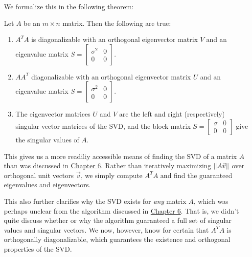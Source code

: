 \documentclass{ximera}
\begin{document}
We formalize this in the following theorem:
 
\begin{theorem}\label{th:singvaldecomp}
Let $A$ be an $m\times n$ matrix. Then the following are true: 

\begin{enumerate}
\item $A^TA$ is diagonalizable with an orthogonal eigenvector matrix $V$ and an eigenvalue matrix $S=\begin{bmatrix}
    \sigma^2&0\\0&0\end{bmatrix}$. 
\item $AA^T$ diagonalizable with an orthogonal eigenvector matrix $U$ and an eigenvalue matrix $S=\begin{bmatrix}
    \sigma^2&0\\0&0\end{bmatrix}$. 
\item The eigenvector matrices $U$ and $V$ are the left and right (respectively) singular vector matrices of the SVD, and the block matrix $S=\begin{bmatrix}
    \sigma&0\\0&0\end{bmatrix}$ give the singular values of $A$.
\end{enumerate}

\end{theorem}

This gives us a more readiliy accessible means of finding the SVD of a matrix $A$ than was discussed in \href{https://ximera.osu.edu/appliedlinearalgebra/c6ChapterSix/learningActivities/m6LearningActivities/leastSquares/PCASVDIntro}{Chapter 6}. Rather than iteratively maximizing $\left\|A\vec{v}\right\|$ over orthogonal unit vectors $\vec{v}$, we simply compute $A^TA$ and find the guaranteed eigenvalues and eigenvectors. 

This also further clarifies why the SVD exists for \emph{any} matrix $A$, which was perhaps unclear from the algorithm discussed in \href{https://ximera.osu.edu/appliedlinearalgebra/c6ChapterSix/learningActivities/m6LearningActivities/leastSquares/PCASVDIntro}{Chapter 6}. That is, we didn't quite discuss whether or why the algorithm guaranteed a full set of singular values and singular vectors. We now, however, know for certain that $A^TA$ is orthogonally diagonalizable, which guarantees the existence and orthogonal properties of the SVD.
 
\end{document}
